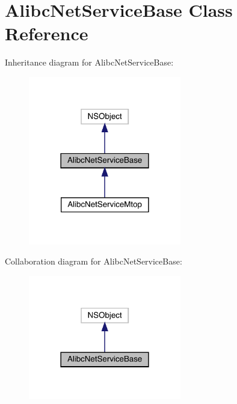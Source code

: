\hypertarget{interface_alibc_net_service_base}{}\section{Alibc\+Net\+Service\+Base Class Reference}
\label{interface_alibc_net_service_base}


Inheritance diagram for Alibc\+Net\+Service\+Base\+:\nopagebreak
\begin{figure}[H]
\begin{center}
\leavevmode
\includegraphics[width=189pt]{interface_alibc_net_service_base__inherit__graph}
\end{center}
\end{figure}


Collaboration diagram for Alibc\+Net\+Service\+Base\+:\nopagebreak
\begin{figure}[H]
\begin{center}
\leavevmode
\includegraphics[width=189pt]{interface_alibc_net_service_base__coll__graph}
\end{center}
\end{figure}
